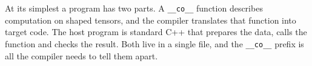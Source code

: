 At its simplest a program has two parts. A \texttt{\_\_co\_\_} function describes computation on shaped tensors, and the compiler translates that function into target code. The host program is standard C++ that prepares the data, calls the function and checks the result. Both live in a single  file, and the \texttt{\_\_co\_\_} prefix is all the compiler needs to tell them apart.
